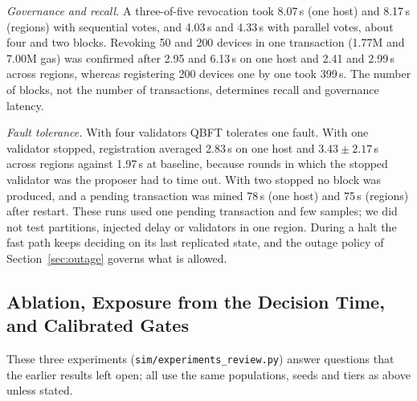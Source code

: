 \begin{table}[t]
\centering
\caption{The same benchmark on one host and with one validator in each of four Google Cloud regions (mean $\pm$ sd; single runs)}
\label{tab:gcp}
\scriptsize
\setlength{\tabcolsep}{3pt}

\end{table}

\emph{Governance and recall.} A three-of-five revocation took 8.07\,s (one host) and 8.17\,s (regions) with sequential votes, and 4.03\,s and 4.33\,s with parallel votes, about four and two blocks. Revoking 50 and 200 devices in one transaction (1.77M and 7.00M gas) was confirmed after 2.95 and 6.13\,s on one host and 2.41 and 2.99\,s across regions, whereas registering 200 devices one by one took 399\,s. The number of blocks, not the number of transactions, determines recall and governance latency.

\emph{Fault tolerance.} With four validators QBFT tolerates one fault. With one validator stopped, registration averaged 2.83\,s on one host and $3.43\pm2.17$\,s across regions against 1.97\,s at baseline, because rounds in which the stopped validator was the proposer had to time out. With two stopped no block was produced, and a pending transaction was mined 78\,s (one host) and 75\,s (regions) after restart. These runs used one pending transaction and few samples; we did not test partitions, injected delay or validators in one region. During a halt the fast path keeps deciding on its last replicated state, and the outage policy of Section~\ref{sec:outage} governs what is allowed.

\subsection{Ablation, Exposure from the Decision Time, and Calibrated Gates}\label{sec:review_eval}
These three experiments (\texttt{sim/experiments\_review.py}) answer questions that the earlier results left open; all use the same populations, seeds and tiers as above unless stated.

